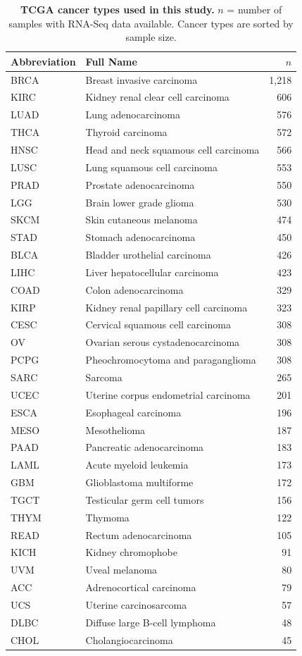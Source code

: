 \documentclass[11pt,a4paper]{article}
\begin{document}
\begin{table}[htbp]
\centering
\caption{\textbf{TCGA cancer types used in this study.} $n$ = number of samples with RNA-Seq data available. Cancer types are sorted by sample size.}
\label{tab:s1}
\small
\begin{tabular}{llr}
\toprule
Abbreviation & Full Name & $n$ \\
\midrule
BRCA & Breast invasive carcinoma & 1,218 \\
KIRC & Kidney renal clear cell carcinoma & 606 \\
LUAD & Lung adenocarcinoma & 576 \\
THCA & Thyroid carcinoma & 572 \\
HNSC & Head and neck squamous cell carcinoma & 566 \\
LUSC & Lung squamous cell carcinoma & 553 \\
PRAD & Prostate adenocarcinoma & 550 \\
LGG & Brain lower grade glioma & 530 \\
SKCM & Skin cutaneous melanoma & 474 \\
STAD & Stomach adenocarcinoma & 450 \\
BLCA & Bladder urothelial carcinoma & 426 \\
LIHC & Liver hepatocellular carcinoma & 423 \\
COAD & Colon adenocarcinoma & 329 \\
KIRP & Kidney renal papillary cell carcinoma & 323 \\
CESC & Cervical squamous cell carcinoma & 308 \\
OV & Ovarian serous cystadenocarcinoma & 308 \\
PCPG & Pheochromocytoma and paraganglioma & 308 \\
SARC & Sarcoma & 265 \\
UCEC & Uterine corpus endometrial carcinoma & 201 \\
ESCA & Esophageal carcinoma & 196 \\
MESO & Mesothelioma & 187 \\
PAAD & Pancreatic adenocarcinoma & 183 \\
LAML & Acute myeloid leukemia & 173 \\
GBM & Glioblastoma multiforme & 172 \\
TGCT & Testicular germ cell tumors & 156 \\
THYM & Thymoma & 122 \\
READ & Rectum adenocarcinoma & 105 \\
KICH & Kidney chromophobe & 91 \\
UVM & Uveal melanoma & 80 \\
ACC & Adrenocortical carcinoma & 79 \\
UCS & Uterine carcinosarcoma & 57 \\
DLBC & Diffuse large B-cell lymphoma & 48 \\
CHOL & Cholangiocarcinoma & 45 \\
\bottomrule
\end{tabular}
\end{table}
\end{document}
